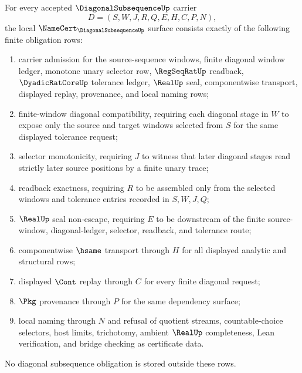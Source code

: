 \begin{theorem}
\label{thm:diagonal-subsequence-namecert-obligations}
For every accepted $\DiagonalSubsequenceUp$ carrier
$$
D=(S,W,J,R,Q,E,H,C,P,N),
$$
the local $\NameCert_{\DiagonalSubsequenceUp}$ surface consists exactly of the following finite obligation rows:
\begin{enumerate}
\item carrier admission for the source-sequence windows, finite diagonal window ledger, monotone unary selector row, $\RegSeqRatUp$ readback, $\DyadicRatCoreUp$ tolerance ledger, $\RealUp$ seal, componentwise transport, displayed replay, provenance, and local naming rows;
\item finite-window diagonal compatibility, requiring each diagonal stage in $W$ to expose only the source and target windows selected from $S$ for the same displayed tolerance request;
\item selector monotonicity, requiring $J$ to witness that later diagonal stages read strictly later source positions by a finite unary trace;
\item readback exactness, requiring $R$ to be assembled only from the selected windows and tolerance entries recorded in $S,W,J,Q$;
\item $\RealUp$ seal non-escape, requiring $E$ to be downstream of the finite source-window, diagonal-ledger, selector, readback, and tolerance route;
\item componentwise $\hsame$ transport through $H$ for all displayed analytic and structural rows;
\item displayed $\Cont$ replay through $C$ for every finite diagonal request;
\item $\Pkg$ provenance through $P$ for the same dependency surface;
\item local naming through $N$ and refusal of quotient streams, countable-choice selectors, host limits, trichotomy, ambient $\RealUp$ completeness, Lean verification, and bridge checking as certificate data.
\end{enumerate}
No diagonal subsequence obligation is stored outside these rows.
\end{theorem}
